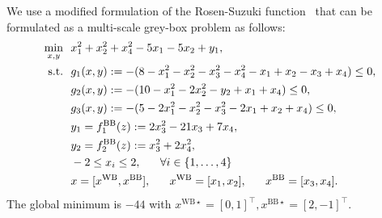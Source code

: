 \documentclass[12pt,a4paper]{article}%
\theoremstyle{plain}%
\theoremstyle{remark}%
\theoremstyle{definition}%
\def\WB{\mathrm{WB}}
\def\BB{\mathrm{BB}}
\begin{document}
\begin{appendices}
We use a modified formulation of the Rosen-Suzuki function~\cite{rosenbrock1960} that can be formulated as a multi-scale grey-box problem as follows:
\begin{align} \label{eq:RosenSuzuki}
    \min_{x, y} &~~ x_1^2 + x_2^2 + x_4^2 - 5x_1 - 5x_2 + y_1, \\\notag
    \text{s.t.} &~~ g_1(x, y) := -(8 - x_1^2 - x_2^2 - x_3^2 - x_4^2 - x_1 + x_2 - x_3 + x_4) \leq 0, \\\notag
    &~~ g_2(x, y) := -(10 - x_1^2 - 2x_2^2 - y_2 + x_1 + x_4) \leq 0, \\\notag
    &~~ g_3(x, y) := -(5 - 2x_1^2 - x_2^2 - x_3^2 - 2x_1 + x_2 + x_4) \leq 0, \\\notag
    &~~ y_1 = f^\BB_1(z) := 2x_3^2 - 21x_3 + 7x_4, \\\notag
    &~~ y_2 = f^\BB_2(z) := x_3^2 + 2x_4^2, \\\notag
    &~~ -2 \leq x_i \leq 2, ~~~~~ \forall i \in \{ 1,\ldots, 4 \} \\\notag
    &~~ x = [x^{\WB}, x^{\BB}], ~~~~~ x^{\WB} = [x_1, x_2], ~~~~~ x^{\BB} = [x_3, x_4].
\end{align}
The global minimum is $-44$ with $x^{\WB\star} = [0, 1]^\top, x^{\BB\star} = [2, -1]^\top$.


\end{appendices}
\end{document}
